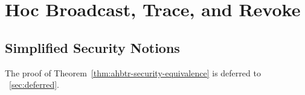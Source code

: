 \section{\Ad Hoc Broadcast, Trace, and Revoke}\label{sec:ahbtr-definitions}







\subsection{Simplified Security Notions}\label{sec:ahbtr-simplified-security}









\noindent
The proof of Theorem~\ref{thm:ahbtr-security-equivalence}
is deferred to \Section~\ref{sec:deferred}.
